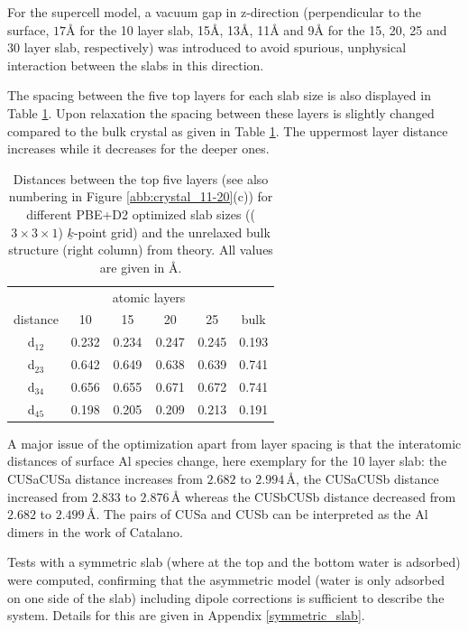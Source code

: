 \documentclass[11pt,DIV=13,BCOR=5mm,a4paper,headinclude]{scrbook}
\renewcommand{\vec}[1]{\underline{#1}}
\begin{document}
For the supercell model, a vacuum gap in z-direction (perpendicular to the surface, $17$\AA{} for the 10 layer slab, 15\AA{}, 13\AA{}, 11\AA{} and 9\AA{} for the 15, 20, 25 and 30 layer slab, respectively) was introduced to avoid spurious, unphysical interaction between the slabs in this direction.

The spacing between the five top layers for each slab size is also displayed in Table \ref{tab:layer-dist}.
Upon relaxation the spacing between these layers is slightly changed compared to the bulk crystal as given in Table \ref{tab:layer-dist}.
The uppermost layer distance increases while it decreases for the deeper ones.
\begin{table}[!ht]
  \centering
 \caption{Distances between the top five layers (see also numbering in Figure \ref{abb:crystal_11-20}(c)) for different PBE+D2 optimized slab sizes (($3\times 3\times 1$) $\vec{k}$-point grid) and the unrelaxed bulk structure (right column) from theory.
All values are given in \AA.} 
\vspace*{.2cm}
\begin{tabular}{c|cccc|c}
\toprule
 & &\multicolumn{2}{c}{atomic layers}&&\\
    distance    & 10   & 15   & 20   & 25   &bulk \\\midrule
 d$_{12}$	&0.232 &0.234 &0.247 &0.245 &0.193 \\
 d$_{23}$	&0.642 &0.649 &0.638 &0.639 &0.741 \\
 d$_{34}$	&0.656 &0.655 &0.671 &0.672 &0.741 \\
 d$_{45}$	&0.198 &0.205 &0.209 &0.213 &0.191 \\\bottomrule
  \end{tabular}
  \label{tab:layer-dist}
\end{table}
A major issue of the optimization apart from layer spacing is that the interatomic distances of surface Al species change, here exemplary for the 10 layer slab: the CUSa\textendash CUSa distance increases from $2.682$ to $2.994\,$\AA{}, the CUSa\textendash CUSb distance increased from $2.833$ to $2.876\,$\AA{} whereas the CUSb\textendash CUSb distance decreased from $2.682$ to $2.499\,$\AA{}.
The pairs of CUSa and CUSb can be interpreted as the Al dimers in the work of Catalano\cite{catalano}.



Tests with a symmetric slab (where at the top and the bottom water is adsorbed) were computed, confirming that the asymmetric model (water is only adsorbed on one side of the slab) including dipole corrections is sufficient to describe the system.
Details for this are given in Appendix \ref{symmetric_slab}.
\end{document}
